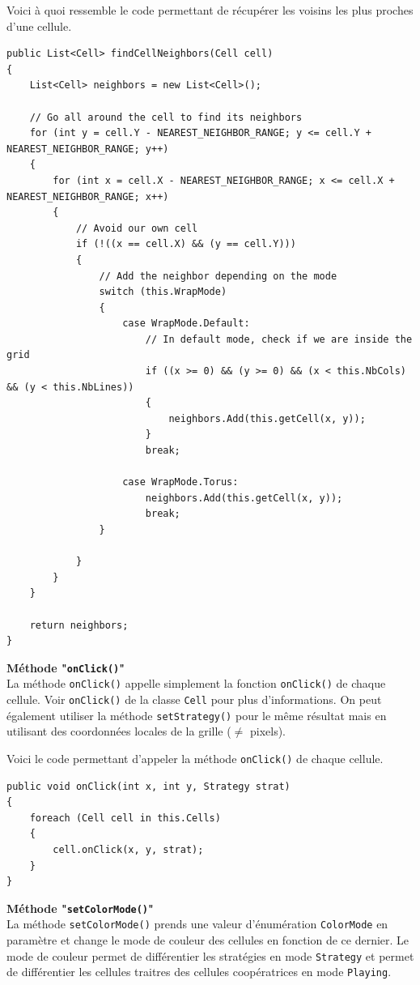 \documentclass[a4paper]{article}
\begin{document}
Voici à quoi ressemble le code permettant de récupérer les voisins les plus proches d'une cellule.
\begin{lstlisting}
public List<Cell> findCellNeighbors(Cell cell)
{
    List<Cell> neighbors = new List<Cell>();

    // Go all around the cell to find its neighbors
    for (int y = cell.Y - NEAREST_NEIGHBOR_RANGE; y <= cell.Y + NEAREST_NEIGHBOR_RANGE; y++)
    {
        for (int x = cell.X - NEAREST_NEIGHBOR_RANGE; x <= cell.X + NEAREST_NEIGHBOR_RANGE; x++)
        {
            // Avoid our own cell
            if (!((x == cell.X) && (y == cell.Y)))
            {
                // Add the neighbor depending on the mode
                switch (this.WrapMode)
                {
                    case WrapMode.Default:
                        // In default mode, check if we are inside the grid
                        if ((x >= 0) && (y >= 0) && (x < this.NbCols) && (y < this.NbLines))
                        {
                            neighbors.Add(this.getCell(x, y));
                        }
                        break;

                    case WrapMode.Torus:
                        neighbors.Add(this.getCell(x, y));
                        break;
                }

            }
        }
    }

    return neighbors;
}
\end{lstlisting}

\pagebreak
\textbf{Méthode "\texttt{onClick()}"}\\
La méthode \texttt{onClick()} appelle simplement la fonction \texttt{onClick()} de chaque cellule. Voir \texttt{onClick()} de la classe \texttt{Cell} pour plus d'informations. On peut également utiliser la méthode \texttt{setStrategy()} pour le même résultat mais en utilisant des coordonnées locales de la grille ($\neq$ pixels).

Voici le code permettant d'appeler la méthode \texttt{onClick()} de chaque cellule.
\begin{lstlisting}
public void onClick(int x, int y, Strategy strat)
{
    foreach (Cell cell in this.Cells)
    {
        cell.onClick(x, y, strat);
    }
}
\end{lstlisting}


\textbf{Méthode "\texttt{setColorMode()}"}\\
La méthode \texttt{setColorMode()} prends une valeur d'énumération \texttt{ColorMode} en paramètre et change le mode de couleur des cellules en fonction de ce dernier. Le mode de couleur permet de différentier les stratégies en mode \texttt{Strategy} et permet de différentier les cellules traitres des cellules coopératrices en mode \texttt{Playing}.
\end{document}
